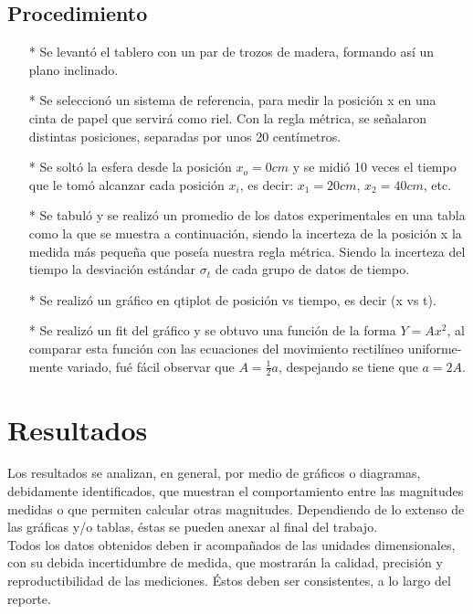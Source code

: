 \documentclass[osajnl,twocolumn,showpacs,superscriptaddress,10pt]{revtex4-1}
\begin{document}
\subsection{Procedimiento}
\begin{enumerate}
\item[*] Se levantó el tablero con un par de trozos de madera, formando así un plano inclinado.
\item[*] Se seleccionó un sistema de referencia, para medir la posición x en una cinta de papel que servirá como riel. Con la regla métrica, se señalaron distintas posiciones, separadas por unos 20 centímetros.
\item[*] Se soltó la esfera desde la posición $x_o = 0 cm $ y se midió 10 veces el tiempo que le tomó alcanzar cada posición $x_i$, es decir: $x_1 = 20 cm$, $x_2 = 40 cm$, etc.
\item[*] Se tabuló y se realizó un promedio de los datos experimentales en una tabla como la que se muestra a continuación, siendo la incerteza de la posición x la medida más pequeña que poseía nuestra regla métrica. Siendo la incerteza del tiempo la desviación estándar $\sigma_t$ de cada grupo de datos de tiempo.
\item[*] Se realizó un gráfico en qtiplot de posición vs tiempo, es decir (x vs t).
\item[*] Se realizó un fit del gráfico y se obtuvo una función de la forma $Y = Ax^2$, al comparar esta función con las ecuaciones del movimiento rectilíneo uniforme-mente variado, fué fácil observar que $ A = \frac{1}{2}a $, despejando se tiene que $ a = 2A$.
\end{enumerate}

\section{Resultados}
Los resultados se analizan, en general, por medio de gráficos o diagramas,
debidamente identificados, que muestran el comportamiento entre las magnitudes
medidas o que permiten calcular otras magnitudes. Dependiendo de lo extenso de las
gráficas y/o tablas, éstas se pueden anexar al final del trabajo.\\

Todos los datos obtenidos deben ir acompañados de las unidades dimensionales,
con su debida incertidumbre de medida, que mostrarán la calidad, precisión y
reproductibilidad de las mediciones. Éstos deben ser consistentes, a lo largo del
reporte.\\
\end{document}
